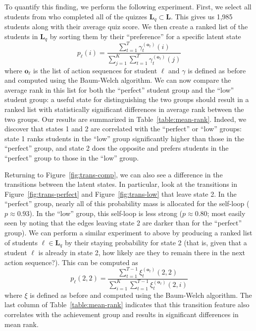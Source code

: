 To quantify this finding, we perform the following experiment. First, we
select all students from \textretrieval{} who completed all of the quizzes
$\mathbf{L}_q \subset \mathbf{L}$. This gives us 1,985 students along with
their average quiz score. We then create a ranked list of the students in
$\mathbf{L}_q$ by sorting them by their ``preference'' for a specific
latent state
\begin{equation}
  p_\ell(i) = \frac{\sum_{t=1}^T \gamma_t^{(\mathbf{o}_\ell)}(i)}
  {\sum_{j=1}^{K} \sum_{t=1}^T \gamma_t^{(\mathbf{o}_\ell)}(j)}
\end{equation}
where $\mathbf{o}_\ell$ is the list of action sequences for student $\ell$
and $\gamma$ is defined as before and computed using the Baum-Welch
algorithm. We can now compare the average rank in this list for both
the ``perfect'' student group and the ``low'' student group: a useful state
for distinguishing the two groups should result in a ranked list with
statistically significant differences in average rank between the two
groups. Our results are summarized in Table~\ref{table:mean-rank}. Indeed,
we discover that states 1 and 2 are correlated with the ``perfect'' or
``low'' groups: state 1 ranks students in the ``low'' group significantly higher
than those in the ``perfect'' group, and state 2 does the opposite and
prefers students in the ``perfect'' group to those in the ``low'' group.

Returning to Figure~\ref{fig:trans-comp}, we can also see a difference in
the transitions between the latent states. In particular, look at the
transitions in Figure~\ref{fig:trans-perfect} and
Figure~\ref{fig:trans-low} that leave state 2. In the ``perfect'' group,
nearly all of this probability mass is allocated for the self-loop ($p
\approx 0.93$). In the ``low'' group, this self-loop is less strong ($p
\approx 0.80$; most easily seen by noting that the edges leaving state 2
are darker than for the ``perfect'' group). We can perform a similar
experiment to above by producing a ranked list of students $\ell \in
\mathbf{L}_q$ by their staying probability for state 2 (that is, given that
a student $\ell$ is already in state 2, how likely are they to remain there
in the next action sequence?). This can be computed as
\begin{equation}
  p_\ell(2, 2) = \frac{\sum_{t=1}^{T-1} \xi_t^{(\mathbf{o}_\ell)}(2,2)}
  {\sum_{i=1}^K \sum_{t=1}^{T-1} \xi_t^{(\mathbf{o}_\ell)}(2,i)}
\end{equation}
where $\xi$ is defined as before and computed using the Baum-Welch
algorithm. The last column of Table~\ref{table:mean-rank} indicates that
this transition feature also correlates with the achievement group and
results in significant differences in mean rank.
